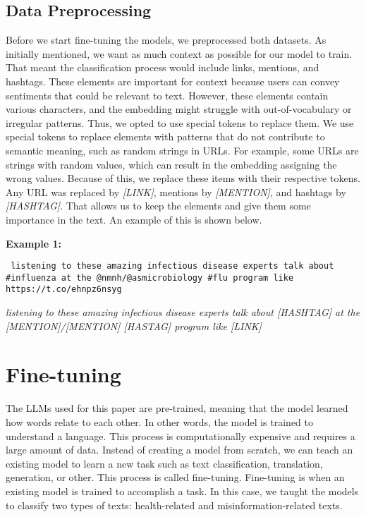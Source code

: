 \subsection{Data Preprocessing}
Before we start fine-tuning the models, we preprocessed both datasets. As initially mentioned, we want as much context as possible for our model to train. That meant the classification
process would include links, mentions, and hashtags. These elements are important for context because users can convey sentiments that could be relevant to text. However, these elements contain various characters, and the embedding might struggle with out-of-vocabulary or irregular
patterns. Thus, we opted to use special tokens to replace them. We use special tokens to replace elements with patterns that do not contribute to semantic meaning, such as random
strings in URLs. For example, some URLs are strings with random values, which can result in the embedding assigning the wrong values. Because of this, we replace these items with
their respective tokens. Any URL was replaced by \textit{[LINK]}, mentions by \textit{[MENTION]}, and hashtags by \textit{[HASHTAG]}. That allows us to keep the elements and give them some importance in the text. An example of this is shown below.

\noindent \textbf{Example 1:}
 \begin{tcolorbox}[colback=gray!10, colframe=black!70, title=Original Text]
	\texttt{%
listening to these amazing infectious disease experts talk about \#influenza at the @nmnh/@asmicrobiology \#flu program like https://t.co/ehnpz6nsyg
	}
\end{tcolorbox}

\begin{tcolorbox}[colback=white, colframe=black!70, title=Preprocessed Result]
	\textit{%
listening to these amazing infectious disease experts talk about [HASHTAG] at the [MENTION]/[MENTION] [HASTAG] program like [LINK]
	}
\end{tcolorbox}


\section{Fine-tuning}

The LLMs used for this paper are pre-trained, meaning that the model learned how words relate to each other. In other words, the model is trained to understand a language.
This process is computationally expensive and requires a large amount of data. Instead of creating a model from scratch, we can teach an existing model to learn a new task such as text classification, translation, generation, or other. This process is called fine-tuning. Fine-tuning is when an existing model is trained to accomplish a task. In this case, we taught the models to classify two types of texts: health-related and
misinformation-related texts. 


